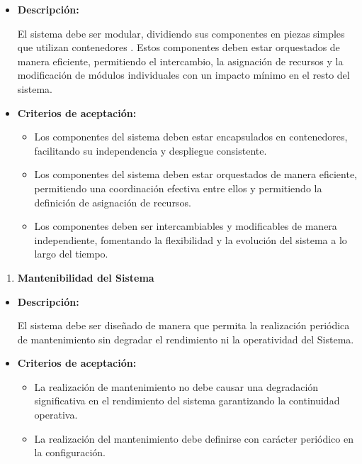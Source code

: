 \documentclass[
  12pt,
  openany]{book}
\providecommand{\tightlist}{%
  \setlength{\itemsep}{0pt}\setlength{\parskip}{0pt}}
\begin{document}
\begin{itemize}
\item
  \textbf{Descripción:}

  El sistema debe ser modular, dividiendo sus componentes en piezas simples que utilizan contenedores . Estos componentes deben estar orquestados de manera eficiente, permitiendo el intercambio, la asignación de recursos y la modificación de módulos individuales con un impacto mínimo en el resto del sistema.
\item
  \textbf{Criterios de aceptación:}

  \begin{itemize}
  \item
    Los componentes del sistema deben estar encapsulados en contenedores, facilitando su independencia y despliegue consistente.
  \item
    Los componentes del sistema deben estar orquestados de manera eficiente, permitiendo una coordinación efectiva entre ellos y permitiendo la definición de asignación de recursos.
  \item
    Los componentes deben ser intercambiables y modificables de manera independiente, fomentando la flexibilidad y la evolución del sistema a lo largo del tiempo.
  \end{itemize}
\end{itemize}

\begin{enumerate}
\def\labelenumi{\arabic{enumi}.}
\setcounter{enumi}{5}
\tightlist
\item
  \textbf{Mantenibilidad del Sistema}
\end{enumerate}

\begin{itemize}
\item
  \textbf{Descripción:}

  El sistema debe ser diseñado de manera que permita la realización periódica de mantenimiento sin degradar el rendimiento ni la operatividad del Sistema.
\item
  \textbf{Criterios de aceptación:}

  \begin{itemize}
  \item
    La realización de mantenimiento no debe causar una degradación significativa en el rendimiento del sistema garantizando la continuidad operativa.
  \item
    La realización del mantenimiento debe definirse con carácter periódico en la configuración.
  \end{itemize}
\end{itemize}
\end{document}
